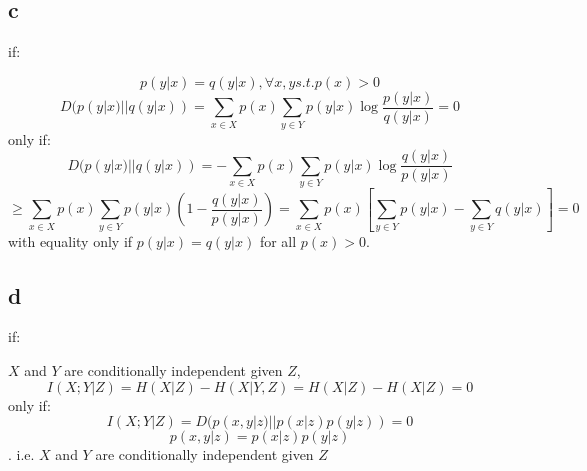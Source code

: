 \documentclass[12pt,a4paper]{article}
\begin{document}
\subsection{c}\noindent
if: 

$$p(y|x)= q(y|x), \forall x,y s.t.p(x)>0$$
$$D(p(y|x)||q(y|x)) = \sum_{x\in X} p(x) \sum_{y\in Y} p(y|x)\log \frac{p(y|x)}{q(y|x)}=0$$
only if: 
$$D(p(y|x)||q(y|x)) = -\sum_{x\in X} p(x) \sum_{y\in Y} p(y|x)\log \frac{q(y|x)}{p(y|x)}  $$
$$ \geq \sum_{x\in X} p(x) \sum_{y\in Y} p(y|x)(1-  \frac{q(y|x)}{p(y|x)} ) = \sum_{x\in X} p(x)[ \sum_{y\in Y} p(y|x) - \sum_{y\in Y} {q(y|x)} ] = 0 $$
with equality only if $p(y|x)=q(y|x)$ for all $p(x)>0$.
\subsection{d}\noindent
if: 

$X$ and $Y$ are conditionally independent given $Z$,
$$I(X;Y|Z) = H(X|Z) - H(X|Y,Z)= H(X|Z) - H(X|Z) = 0$$
only if:
$$I(X;Y|Z) = D(p(x,y|z)||p(x|z)p(y|z)) = 0$$
$$p(x,y|z)=p(x|z)p(y|z)$$. i.e. $X$ and $Y$ are conditionally independent given $Z$
\end{document}
